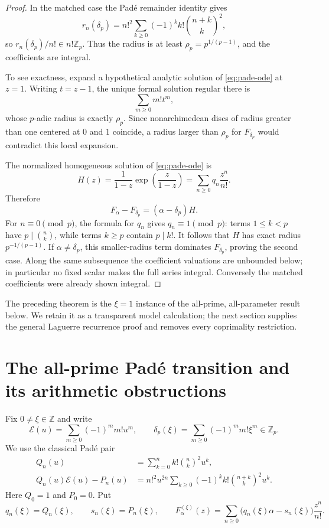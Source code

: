 \documentclass[11pt]{article}
\theoremstyle{definition}
\theoremstyle{remark}
\newcommand{\Z}{\mathbb Z}
\begin{document}
\begin{proof}
In the matched case the Pad\'e remainder identity gives
\[
 r_n(\delta_p)
 =n!^2\sum_{k\ge0}(-1)^kk!\binom{n+k}{k}^2,
\]
so \(r_n(\delta_p)/n!\in n!\Z_p\).  Thus the radius is at least
\(\rho_p=p^{1/(p-1)}\), and the coefficients are integral.

To see exactness, expand a hypothetical analytic solution of
\eqref{eq:pade-ode} at \(z=1\).  Writing \(t=z-1\), the unique formal
solution regular there is
\[
 \sum_{m\ge0}m!t^m,
\]
whose \(p\)-adic radius is exactly \(\rho_p\).  Since nonarchimedean discs of
radius greater than one centered at \(0\) and \(1\) coincide, a radius larger
than \(\rho_p\) for \(F_{\delta_p}\) would contradict this local expansion.

The normalized homogeneous solution of \eqref{eq:pade-ode} is
\begin{equation}\label{eq:homogeneous}
 H(z)=\frac{1}{1-z}\exp\left(\frac{z}{1-z}\right)
 =\sum_{n\ge0}q_n\frac{z^n}{n!}.
\end{equation}
Therefore
\[
 F_\alpha-F_{\delta_p}=(\alpha-\delta_p)H.
\]
For \(n\equiv0\pmod p\), the formula for \(q_n\) gives
\(q_n\equiv1\pmod p\): terms \(1\le k<p\) have
\(p\mid\binom nk\), while terms \(k\ge p\) contain \(p\mid k!\).
It follows that \(H\) has exact radius \(p^{-1/(p-1)}\).  If
\(\alpha\ne\delta_p\), this smaller-radius term dominates
\(F_{\delta_p}\), proving the second case.  Along the same subsequence the
coefficient valuations are unbounded below; in particular no fixed scalar
makes the full series integral.  Conversely the matched coefficients were
already shown integral.
\end{proof}

The preceding theorem is the \(\xi=1\) instance of the all-prime,
all-parameter result below.  We retain it as a transparent model calculation;
the next section supplies the general Laguerre recurrence proof and removes
every coprimality restriction.


\section{The all-prime Pad\'e transition and its arithmetic obstructions}
\label{sec:all-prime-pade}

Fix $0\ne\xi\in\mathbb Z$ and write
\[
 \mathcal E(u)=\sum_{m\geq0}(-1)^m m!u^m,
 \qquad
 \delta_p(\xi)=\sum_{m\geq0}(-1)^m m!\xi^m\in\mathbb Z_p.
\]
We use the classical Pad\'e pair~\cite{MZ2018}
\begin{align}
 Q_n(u)&=\sum_{k=0}^n k!\binom nk^2u^k,\label{eq:Qn-def}\\
 Q_n(u)\mathcal E(u)-P_n(u)
 &=n!^2u^{2n}\sum_{k\geq0}(-1)^k k!
       \binom{n+k}{k}^2u^k.\label{eq:pade-rem}
\end{align}
Here $Q_0=1$ and $P_0=0$.  Put
\[
 q_n(\xi)=Q_n(\xi),\qquad s_n(\xi)=P_n(\xi),\qquad
 F_{\alpha}^{(\xi)}(z)
 =\sum_{n\geq0}\bigl(q_n(\xi)\alpha-s_n(\xi)\bigr)\frac{z^n}{n!}.
\]
\end{document}
